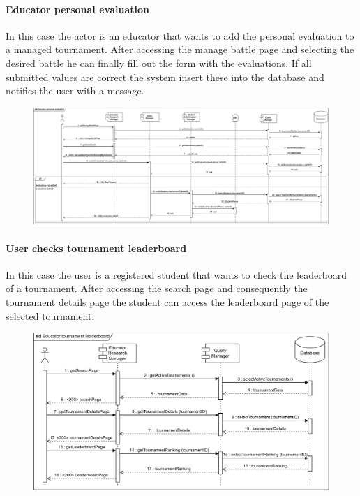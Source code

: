 \documentclass[12pt, a4paper]{report}
\begin{document}
    \paragraph*{Educator personal evaluation}
    In this case the actor is an educator that wants to add the personal evaluation to a managed tournament. 
    After accessing the manage battle page and selecting the desired battle he can finally fill out the form with the evaluations.
    If all submitted values are correct the system insert these into the database and notifies the user with a message.
    \begin{figure}[H]
        \centering
        \includegraphics[width=1.0\linewidth]{images/eperv.png}
    \end{figure}

    \paragraph*{User checks tournament leaderboard}
    In this case the user is a registered student that wants to check the leaderboard of a tournament. 
    After accessing the search page and consequently the tournament details page the student can access the leaderboard page of the selected tournament. 
    \begin{figure}[H]
        \centering
        \includegraphics[width=1.0\linewidth]{images/etlrv.png}
    \end{figure}
\end{document}
